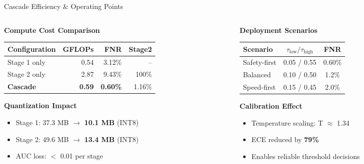 \documentclass[aspectratio=169,12pt]{beamer}
\newcommand{\highlight}[1]{\textcolor{primaryblue}{\textbf{#1}}}
\newcommand{\successtext}[1]{\textcolor{successgreen}{\textbf{#1}}}
\begin{document}
\begin{frame}{Cascade Efficiency \& Operating Points}
\small
\begin{columns}[T]
\begin{column}{0.55\textwidth}
\textbf{Compute Cost Comparison}
\begin{center}
\scriptsize
\begin{tabular}{lrrr}
\toprule
\textbf{Configuration} & \textbf{GFLOPs} & \textbf{FNR} & \textbf{Stage2} \\
\midrule
Stage 1 only & 0.54 & 3.12\% & -- \\
Stage 2 only & 2.87 & 9.43\% & 100\% \\
\midrule
\textbf{Cascade} & \highlight{0.59} & \successtext{0.60\%} & 1.16\% \\
\bottomrule
\end{tabular}
\end{center}

\vspace{0.15em}
\textbf{Quantization Impact}
\begin{itemize}
\setlength\itemsep{0.03em}
    \item Stage 1: 37.3 MB $\rightarrow$ \highlight{10.1 MB} (INT8)
    \item Stage 2: 49.6 MB $\rightarrow$ \highlight{13.4 MB} (INT8)
    \item AUC loss: $<$ 0.01 per stage
\end{itemize}
\end{column}

\begin{column}{0.45\textwidth}
\textbf{Deployment Scenarios}
\begin{center}
\scriptsize
\begin{tabular}{lcc}
\toprule
\textbf{Scenario} & $\tau_{\text{low}}/\tau_{\text{high}}$ & \textbf{FNR} \\
\midrule
Safety-first & 0.05 / 0.55 & 0.60\% \\
Balanced & 0.10 / 0.50 & 1.2\% \\
Speed-first & 0.15 / 0.45 & 2.0\% \\
\bottomrule
\end{tabular}
\end{center}

\vspace{0.1em}
\textbf{Calibration Effect}
\begin{itemize}
\setlength\itemsep{0.03em}
    \item Temperature scaling: T $\approx$ 1.34
    \item ECE reduced by \highlight{79\%}
    \item Enables reliable threshold decisions
\end{itemize}
\end{column}
\end{columns}


\end{frame}
\end{document}
